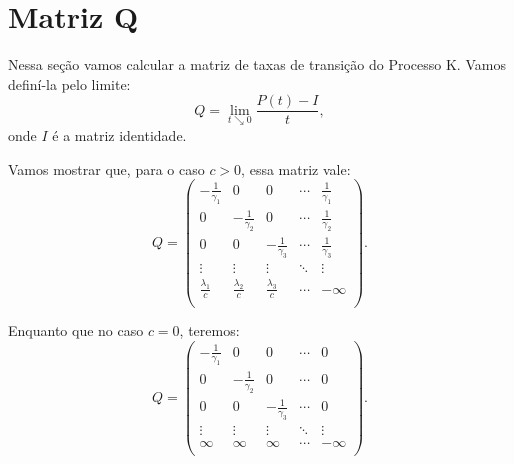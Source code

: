 
\section{Matriz Q}
\label{sec:matrizq}

Nessa seção vamos calcular a matriz de taxas de transição do 
Processo K. Vamos definí-la pelo limite:
\begin{displaymath}
  Q = \lim_{t \searrow 0} \frac{P(t) - I}{t}, 
\end{displaymath}
onde $I$ é a matriz identidade.

Vamos mostrar que, para o caso $c > 0$, essa matriz vale:
\begin{displaymath}
  Q = \left(
    \begin{array}{ccccc}
      -\frac{1}{\gamma_1} & 0 & 0 & \cdots & \frac{1}{\gamma_1}\\
      0 & -\frac{1}{\gamma_2} & 0 & \cdots & \frac{1}{\gamma_2}\\
      0 & 0 & -\frac{1}{\gamma_3} & \cdots & \frac{1}{\gamma_3}\\
      \vdots & \vdots & \vdots & \ddots & \vdots \\
      \frac{\lambda_1}{c} & \frac{\lambda_2}{c} &
      \frac{\lambda_3}{c} & \cdots & -\infty\\
    \end{array}
  \right).
\end{displaymath}

Enquanto que no caso $c=0$, teremos:
\begin{displaymath}
  Q = \left(
    \begin{array}{ccccc}
      -\frac{1}{\gamma_1} & 0 & 0 & \cdots & 0\\
      0 & -\frac{1}{\gamma_2} & 0 & \cdots & 0\\
      0 & 0 & -\frac{1}{\gamma_3} & \cdots & 0\\
      \vdots & \vdots & \vdots & \ddots & \vdots \\
      \infty & \infty & \infty & \cdots & -\infty\\
    \end{array}
  \right).
\end{displaymath}

